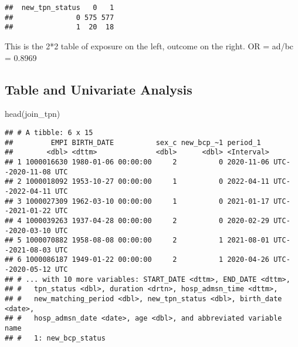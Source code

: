 \documentclass[
]{article}
\newenvironment{Shaded}{\begin{snugshade}}{\end{snugshade}}
\newcommand{\FunctionTok}[1]{\textcolor[rgb]{0.00,0.00,0.00}{#1}}
\newcommand{\NormalTok}[1]{#1}
\begin{document}
\begin{verbatim}
##  new_tpn_status   0   1
##               0 575 577
##               1  20  18
\end{verbatim}

This is the 2*2 table of exposure on the left, outcome on the right. OR
= ad/bc = 0.8969

\hypertarget{table-and-univariate-analysis}{%
\subsection{Table and Univariate
Analysis}\label{table-and-univariate-analysis}}

\begin{Shaded}
\begin{Highlighting}[]
\FunctionTok{head}\NormalTok{(join\_tpn)}
\end{Highlighting}
\end{Shaded}

\begin{verbatim}
## # A tibble: 6 x 15
##         EMPI BIRTH_DATE          sex_c new_bcp_~1 period_1                      
##        <dbl> <dttm>              <dbl>      <dbl> <Interval>                    
## 1 1000016630 1980-01-06 00:00:00     2          0 2020-11-06 UTC--2020-11-08 UTC
## 2 1000018092 1953-10-27 00:00:00     1          0 2022-04-11 UTC--2022-04-11 UTC
## 3 1000027309 1962-03-10 00:00:00     1          0 2021-01-17 UTC--2021-01-22 UTC
## 4 1000039263 1937-04-28 00:00:00     2          0 2020-02-29 UTC--2020-03-10 UTC
## 5 1000070882 1958-08-08 00:00:00     2          1 2021-08-01 UTC--2021-08-03 UTC
## 6 1000086187 1949-01-22 00:00:00     2          1 2020-04-26 UTC--2020-05-12 UTC
## # ... with 10 more variables: START_DATE <dttm>, END_DATE <dttm>,
## #   tpn_status <dbl>, duration <drtn>, hosp_admsn_time <dttm>,
## #   new_matching_period <dbl>, new_tpn_status <dbl>, birth_date <date>,
## #   hosp_admsn_date <date>, age <dbl>, and abbreviated variable name
## #   1: new_bcp_status
\end{verbatim}
\end{document}
